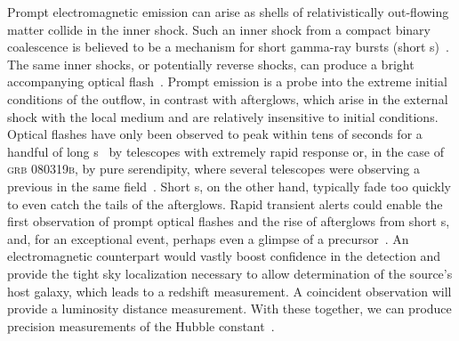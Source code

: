 Prompt electromagnetic emission can arise as shells of relativistically
out-flowing matter collide in the inner shock. Such an inner shock from a
compact binary coalescence is believed to be a mechanism for short gamma-ray
bursts (short \GRB{}s)~\cite{Lee:2005, nakar07}. The same inner shocks, or
potentially reverse shocks, can produce a bright accompanying optical
flash~\cite{Sari99}. Prompt emission is a probe into the extreme initial
conditions of the outflow, in contrast with afterglows, which arise in the
external shock with the local medium and are relatively
insensitive to initial conditions. Optical flashes have only been observed to
peak within tens of seconds for a handful of long
\GRB{}s~\cite{2011CRPhy..12..255A} by telescopes with extremely rapid response
or, in the case of \textsc{grb 080319b}, by pure serendipity, where several
telescopes were observing a previous \GRB{} in the same
field~\cite{2008Natur.455..183R}. Short \GRB{}s, on the other hand, typically
fade too quickly to even catch the tails of the afterglows. Rapid
\GW{} transient alerts could enable the first observation of
prompt optical flashes and the rise of afterglows from short \GRB{}s, and, for
an exceptional event, perhaps even a glimpse of a
precursor~\cite{0004-637X-723-2-1711}. An electromagnetic counterpart would
vastly boost confidence in the \GW{} detection and provide the
tight sky localization necessary to allow determination of the source's host
galaxy, which leads to a redshift measurement. A coincident \GW{}
observation will provide a luminosity distance measurement. With these
together, we can produce precision measurements of the Hubble
constant~\cite{2010ApJ...725..496N}.

